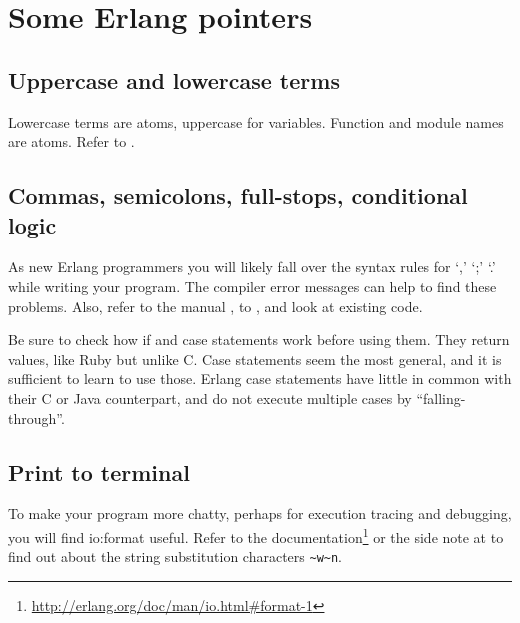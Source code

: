 \documentclass[a4paper]{article}
\begin{document}





\section{Some Erlang pointers} %
\label{sec:some_erlang_pointers}

\subsection{Uppercase and lowercase terms} %
\label{sub:uppercase_and_lowercase_terms}

Lowercase terms are atoms, uppercase for variables. Function and module names
are atoms. Refer to \cite{manual_expressions}.


\subsection{Commas, semicolons, full-stops, conditional logic} %
\label{sub:commas_semicolons_full_stops}

As new Erlang programmers you will likely fall over the syntax rules for `,'
`;' `.' while writing your program. The compiler error messages can help to
find these problems. Also, refer to the manual \cite{manual_functions}, to
\cite{lyse_function_syntax}, and look at existing code.

Be sure to check how if and case statements work before using them. They
return values, like Ruby but unlike C. Case statements seem the most general,
and it is sufficient to learn to use those. Erlang case statements have little
in common with their C or Java counterpart, and do not execute multiple
cases by ``falling-through''.


\subsection{Print to terminal} %
\label{sub:debug_printing}

To make your program more chatty, perhaps for execution tracing and debugging,
you will find io:format useful. Refer to
the documentation\footnote{\url{http://erlang.org/doc/man/io.html\#format-1}}
or the side note at \cite{lyse_function_syntax} to
find out about the string substitution characters \verb!~w~n!.
\end{document}
